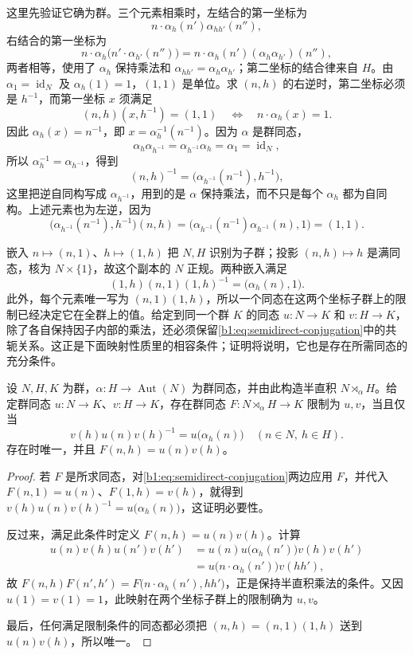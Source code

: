 这里先验证它确为群。三个元素相乘时，左结合的第一坐标为
\[
	n\cdot\alpha_h(n')\alpha_{hh'}(n''),
\]
右结合的第一坐标为
\[
	n\cdot\alpha_h\bigl(n'\cdot\alpha_{h'}(n'')\bigr) =n\cdot\alpha_h(n')(\alpha_h\alpha_{h'})(n''),
\]
两者相等，使用了 \(\alpha_h\) 保持乘法和 \(\alpha_{hh'}=\alpha_h\alpha_{h'}\)；第二坐标的结合律来自 \(H\)。由 \(\alpha_1=\operatorname{id}_N\) 及 \(\alpha_h(1)=1\)，\((1,1)\) 是单位。求 \((n,h)\) 的右逆时，第二坐标必须是 \(h^{-1}\)，而第一坐标 \(x\) 须满足
\[
	(n,h)(x,h^{-1})=(1,1) \quad\Longleftrightarrow\quad n\cdot\alpha_h(x)=1.
\]
因此 \(\alpha_h(x)=n^{-1}\)，即 \(x=\alpha_h^{-1}(n^{-1})\)。因为 \(\alpha\) 是群同态，
\[
	\alpha_h\alpha_{h^{-1}}=\alpha_{h^{-1}}\alpha_h =\alpha_1=\operatorname{id}_N,
\]
所以 \(\alpha_h^{-1}=\alpha_{h^{-1}}\)，得到
\[
	(n,h)^{-1}=\bigl(\alpha_{h^{-1}}(n^{-1}),h^{-1}\bigr),
\]
这里把逆自同构写成 \(\alpha_{h^{-1}}\)，用到的是 \(\alpha\) 保持乘法，而不只是每个 \(\alpha_h\) 都为自同构。上述元素也为左逆，因为
\[
	\bigl(\alpha_{h^{-1}}(n^{-1}),h^{-1}\bigr)(n,h) =\bigl(\alpha_{h^{-1}}(n^{-1})\alpha_{h^{-1}}(n),1\bigr) =(1,1).
\]

嵌入 \(n\mapsto(n,1)\)、\(h\mapsto(1,h)\) 把 \(N,H\) 识别为子群；投影 \((n,h)\mapsto h\) 是满同态，核为 \(N\times\{1\}\)，故这个副本的 \(N\) 正规。两种嵌入满足
\begin{equation}\label{b1:eq:semidirect-conjugation}
	(1,h)(n,1)(1,h)^{-1}=\bigl(\alpha_h(n),1\bigr).
\end{equation}
此外，每个元素唯一写为 \((n,1)(1,h)\)，所以一个同态在这两个坐标子群上的限制已经决定它在全群上的值。给定到同一个群 \(K\) 的同态 \(u:N\rightarrow K\) 和 \(v:H\rightarrow K\)，除了各自保持因子内部的乘法，还必须保留\eqref{b1:eq:semidirect-conjugation}中的共轭关系。这正是下面映射性质里的相容条件；证明将说明，它也是存在所需同态的充分条件。

\begin{proposition}[半直积的映射性质]\label{b1:prop:semidirect-universal}
	设 \(N,H,K\) 为群，\(\alpha:H\rightarrow\operatorname{Aut}(N)\) 为群同态，并由此构造半直积 \(N\rtimes_\alpha H\)。给定群同态 \(u:N\rightarrow K\)、\(v:H\rightarrow K\)，存在群同态 \(F:N\rtimes_\alpha H\rightarrow K\) 限制为 \(u,v\)，当且仅当
	\[
		v(h)u(n)v(h)^{-1}=u\bigl(\alpha_h(n)\bigr) \quad(n\in N,\ h\in H).
	\]
	存在时唯一，并且 \(F(n,h)=u(n)v(h)\)。
\end{proposition}
\begin{proof}
	若 \(F\) 是所求同态，对\eqref{b1:eq:semidirect-conjugation}两边应用 \(F\)，并代入 \(F(n,1)=u(n)\)、\(F(1,h)=v(h)\)，就得到 \(v(h)u(n)v(h)^{-1}=u\bigl(\alpha_h(n)\bigr)\)，这证明必要性。

	反过来，满足此条件时定义 \(F(n,h)=u(n)v(h)\)。计算
	\[
		\begin{aligned}
			u(n)v(h)u(n')v(h') &=u(n)u\bigl(\alpha_h(n')\bigr)v(h)v(h')\\
			&=u\bigl(n\cdot\alpha_h(n')\bigr)v(hh'),
		\end{aligned}
	\]
	故 \(F(n,h)F(n',h')=F\bigl(n\cdot\alpha_h(n'),hh'\bigr)\)，正是保持半直积乘法的条件。又因 \(u(1)=v(1)=1\)，此映射在两个坐标子群上的限制确为 \(u,v\)。

	最后，任何满足限制条件的同态都必须把 \((n,h)=(n,1)(1,h)\) 送到 \(u(n)v(h)\)，所以唯一。
\end{proof}

